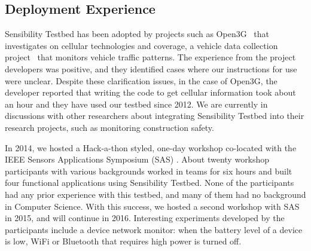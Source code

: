 

%
%

\subsection{Deployment Experience}\label{sec-deployment}



Sensibility Testbed has been adopted by projects such as 
Open3G~\cite{open3g} that investigates on cellular technologies 
and coverage, a vehicle data collection project~\cite{reininger2015first} 
that monitors vehicle traffic patterns. The experience from the 
project developers was positive, and they identified cases where our 
instructions for use were unclear. Despite these clarification issues, in 
the case of Open3G, the developer reported that writing the code to
get cellular information took about an hour and they have used our
testbed since 2012. We are currently in discussions with other 
researchers about integrating Sensibility Testbed into their research
projects, such as monitoring construction safety.

In 2014, we hosted a Hack-a-thon styled, one-day workshop co-located with 
the IEEE Sensors Applications Symposium (SAS) \cite{sas}. About twenty 
workshop participants with various backgrounds worked in teams 
for six hours and built four functional applications using Sensibility 
Testbed. None of the participants had any prior experience with 
this testbed, and many of them had no background in Computer
Science. With this success, we hosted a second workshop with 
SAS in 2015, and will continue in 2016. Interesting experiments 
developed by the participants include a device network monitor: 
when the battery level of a device is low, WiFi or Bluetooth that 
requires high power is turned off.

